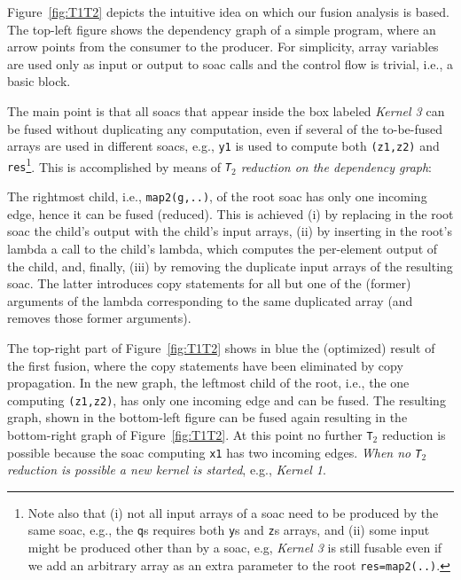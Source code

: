 \documentclass{sigplanconf}  %
\newcommand{\emp}[1]{\textcolor{DikuRed}{ #1}}
\begin{document}
Figure~\ref{fig:T1T2} depicts the intuitive idea on which
our fusion analysis is based.   The top-left figure shows
the dependency graph of a simple program, where an 
arrow points from the consumer to the producer. 
%
For simplicity, array variables are used only as input or 
output to {\sc soac} calls and the control flow is trivial,
i.e., a basic block. 

The main point is that all {\sc soac}s that appear inside the box
labeled \emp{\em Kernel 3} can be fused without duplicating any
computation, even if several of the to-be-fused 
arrays are used in different {\sc soac}s, e.g., {\tt y1} is used to
compute both {\tt (z1,z2)} and {\tt res}\footnote{
Note also that (i) not all input arrays of a {\sc soac} need to be produced
by the same {\sc soac}, e.g., the {\tt q}s requires both {\tt y}s and 
{\tt z}s arrays, and (ii) some input might be produced other than 
by a {\sc soac}, e.g, \emp{\em Kernel 3} is still fusable even if 
we add an arbitrary array as an extra parameter to the root {\tt res=map2(..)}. 
}. 
This is accomplished by means of {\em {\tt T$_2$} reduction on the dependency graph}:

The rightmost child, i.e., {\tt map2(g,..)}, of the root {\sc soac} 
has only one incoming edge, 
hence it can be fused (reduced). This is achieved  (i) by replacing in
the root {\sc soac} the child's output with the child's input arrays, 
(ii) by inserting in the root's lambda a call to the child's lambda,
which computes the per-element output of the child, %
and, finally, (iii) by removing the duplicate input arrays of the resulting {\sc soac}.
The latter introduces copy statements for all but one 
of the (former) arguments of the lambda corresponding to the same duplicated
array (and removes those former arguments).


The top-right part of Figure~\ref{fig:T1T2} shows in blue the (optimized) 
result of the first fusion, where the copy statements have been eliminated 
by copy propagation.   In the new graph, the leftmost child of the root, 
i.e., the one computing {\tt (z1,z2)}, has only one incoming edge 
and can be fused.  The resulting graph, shown in the bottom-left figure
can be fused again resulting in the bottom-right graph of Figure~\ref{fig:T1T2}.
At this point no further {\tt T}$_2$ reduction is possible because
the {\sc soac} computing {\tt x1} has two incoming edges. 
%
{\em When no {\tt T}$_2$ reduction is possible a new kernel is started}, 
e.g., \emp{\em Kernel 1}.
\end{document}
